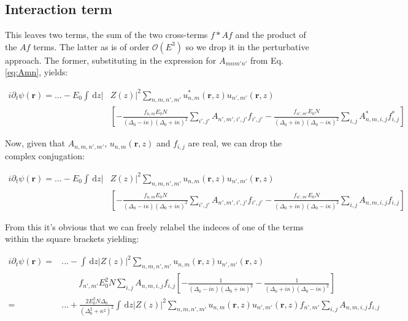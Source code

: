 \documentclass[a4paper,nobalancelastpage]{revtex4-1}
\newcommand{\vect}[1]{\bm{#1}}
\begin{document}
\subsection{Interaction term}

This leaves two terms, the sum of the two cross-terms $f * Af$ and the product of the $Af$ terms. 
The latter as is of order $\mathcal{O}(E^3)$ so we drop it in the perturbative approach.
The former, substituting in the expression for $A_{mnm'n'}$ from Eq.\ref{eq:Amn}, yields:

\begin{align}
i \partial_t \psi(\vect{r})=...-
E_0 
\int \, \mathrm{d}z |&Z(z)|^2 \sum_{n,m,n',m'} u_{n,m}^*(\vect{r},z) u_{n',m'}(\vect{r},z) \nonumber \\
&\left[
- \frac{f_{n,m} E_0 N}{(\Delta_0-i\kappa)(\Delta_0+i\kappa)^2} \sum_{i',j'} A_{n',m',i',j'} f_{i',j'} 
- \frac{f_{n',m'} E_0 N}{(\Delta_0+i\kappa)(\Delta_0-i\kappa)^2 } \sum_{i,j} A^*_{n,m,i,j} f^*_{i,j}
\right] 
\end{align}

Now, given that $A_{n,m,n',m'}$, $u_{n,m}(\vect{r},z)$ and $f_{i,j}$ are real, we can drop the complex conjugation:

\begin{align}
i \partial_t \psi(\vect{r})=...-
E_0 
\int \, \mathrm{d}z |&Z(z)|^2 \sum_{n,m,n',m'} u_{n,m} (\vect{r},z) u_{n',m'}(\vect{r},z) \nonumber \\
&\left[
- \frac{f_{n,m} E_0 N}{(\Delta_0-i\kappa)(\Delta_0+i\kappa)^2} \sum_{i',j'} A_{n',m',i',j'} f_{i',j'} 
- \frac{f_{n',m'} E_0 N}{(\Delta_0+i\kappa)(\Delta_0-i\kappa)^2 } \sum_{i,j} A_{n,m,i,j} f_{i,j}
\right] 
\end{align}

From this it's obvious that we can freely relabel the indeces of one of the terms within the square brackets yielding:

\begin{align}
i \partial_t \psi(\vect{r})=&...-
\int \, \mathrm{d}z |Z(z)|^2 \sum_{n,m,n',m'} u_{n,m} (\vect{r},z) u_{n',m'}(\vect{r},z) \nonumber \\
& \qquad f_{n',m'} E^2_0 N  \sum_{i,j} A_{n,m,i,j} f_{i,j}  \left[
- \frac{1}{(\Delta_0-i\kappa)(\Delta_0+i\kappa)^2}
- \frac{1}{(\Delta_0+i\kappa)(\Delta_0-i\kappa)^2 }
\right] \nonumber \\
=&...+ \frac{ 2E^2_0 N \Delta_0 }{(\Delta_0^2+\kappa^2)^2}
\int \, \mathrm{d}z |Z(z)|^2 \sum_{n,m,n',m'} u_{n,m} (\vect{r},z) u_{n',m'}(\vect{r},z) f_{n',m'}  \sum_{i,j} A_{n,m,i,j} f_{i,j}
\end{align}
\end{document}
